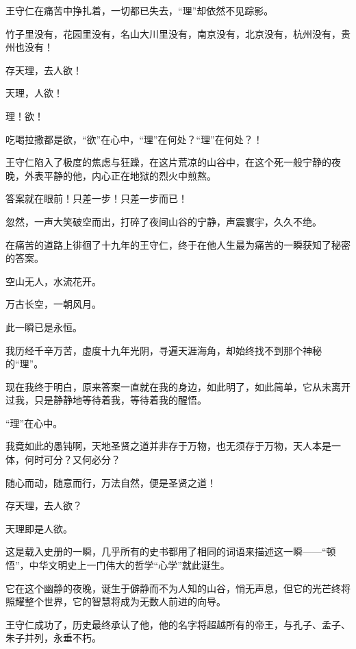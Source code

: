 \begin{multicols}{\theparacolNo}
王守仁在痛苦中挣扎着，一切都已失去，“理”却依然不见踪影。

竹子里没有，花园里没有，名山大川里没有，南京没有，北京没有，杭州没有，贵州也没有！

存天理，去人欲！

天理，人欲！

理！欲！

吃喝拉撒都是欲，“欲”在心中，“理”在何处？“理”在何处？！

王守仁陷入了极度的焦虑与狂躁，在这片荒凉的山谷中，在这个死一般宁静的夜晚，外表平静的他，内心正在地狱的烈火中煎熬。

答案就在眼前！只差一步！只差一步而已！

忽然，一声大笑破空而出，打碎了夜间山谷的宁静，声震寰宇，久久不绝。

在痛苦的道路上徘徊了十九年的王守仁，终于在他人生最为痛苦的一瞬获知了秘密的答案。

空山无人，水流花开。

万古长空，一朝风月。

此一瞬已是永恒。

我历经千辛万苦，虚度十九年光阴，寻遍天涯海角，却始终找不到那个神秘的“理”。

现在我终于明白，原来答案一直就在我的身边，如此明了，如此简单，它从未离开过我，只是静静地等待着我，等待着我的醒悟。

“理”在心中。

我竟如此的愚钝啊，天地圣贤之道并非存于万物，也无须存于万物，天人本是一体，何时可分？又何必分？

随心而动，随意而行，万法自然，便是圣贤之道！

存天理，去人欲？

天理即是人欲。

这是载入史册的一瞬，几乎所有的史书都用了相同的词语来描述这一瞬——“顿悟”，中华文明史上一门伟大的哲学“心学”就此诞生。

它在这个幽静的夜晚，诞生于僻静而不为人知的山谷，悄无声息，但它的光芒终将照耀整个世界，它的智慧将成为无数人前进的向导。

王守仁成功了，历史最终承认了他，他的名字将超越所有的帝王，与孔子、孟子、朱子并列，永垂不朽。
\ifnum{}
	\end{multicols}
\fi
\newpage
